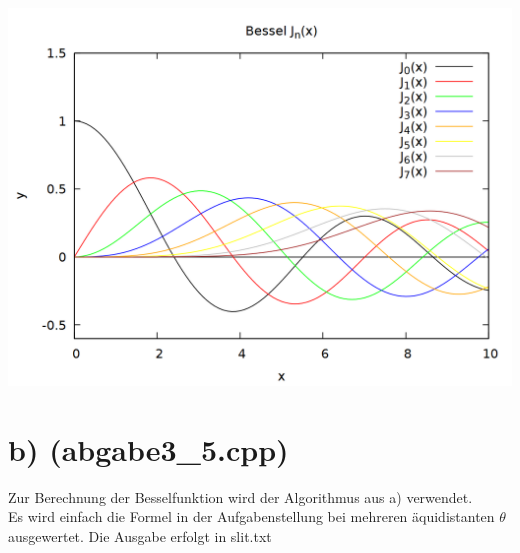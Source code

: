\documentclass{scrreprt}
\begin{document}
\begin{center}
\includegraphics[scale=0.3]{5_plot_bessel.png}
\end{center}

\section*{b) (abgabe3\_5.cpp)}
Zur Berechnung der Besselfunktion wird der Algorithmus aus a) verwendet.\\
Es wird einfach die Formel in der Aufgabenstellung bei mehreren äquidistanten $\theta$ ausgewertet. Die Ausgabe erfolgt in slit.txt\\
\end{document}
